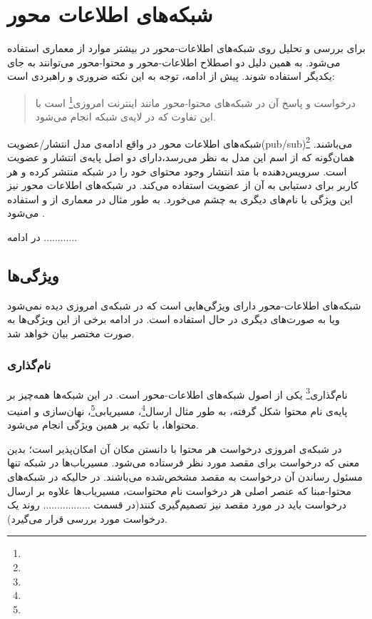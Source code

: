 
\chapter{شبکه‌های اطلاعات محور}

برای بررسی و تحلیل روی شبکه‌های اطلاعات-محور در بیشتر موارد از معماری  استفاده می‌شود. به همین دلیل دو اصطلاح اطلاعات-محور و محتوا-محور می‌توانند به جای یکدیگر استفاده شوند. پیش از ادامه‌، توجه به این نکته ضروری و راهبردی است:
\begin{quote}
	درخواست و پاسخ آن در شبکه‌های محتوا-محور مانند اینترنت امروزی\footnote{} است با این تفاوت که در لایه‌ی شبکه انجام می‌شود.
\end{quote}

شبکه‌های اطلاعات محور در واقع ادامه‌ی مدل انتشار/عضویت(pub/sub)\footnote{} می‌باشند. همان‌گونه که از اسم این مدل به نظر می‌رسد،دارای دو اصل پایه‌ی انتشار و عضویت است. سرویس‌دهنده با متد انتشار وجود محتوای خود را در شبکه منتشر کرده و هر کاربر برای دستیابی به آن از عضویت استفاده می‌کند. در شبکه‌های اطلاعات محور نیز این ویژگی با نام‌های دیگری به چشم می‌خورد. به طور مثال در معماری  از  و  استفاده می‌شود \cite{ndn}.

در ادامه ............


\section{ویژگی‌ها}
شبکه‌های اطلاعات-محور دارای ویژگی‌هایی است که در شبکه‌ی امروزی دیده نمی‌شود ویا به صورت‌های دیگری در حال استفاده است. در ادامه برخی از این ویژگی‌ها به صورت مختصر بیان خواهد شد.

\subsection{نام‌گذاری}
نام‌گذاری\footnote{} یکی از اصول شبکه‌های اطلاعات-محور است. در این شبکه‌ها همه‌چیز بر پایه‌ی نام محتوا شکل گرفته، به طور مثال ارسال\footnote{}، مسیریابی\footnote{}، نهان‌سازی و امنیت محتواها، با تکیه بر همین ویژگی انجام می‌شود. 

در شبکه‌ی امروزی درخواست هر محتوا با دانستن مکان آن امکان‌پذیر است؛ بدین معنی که درخواست برای مقصد مورد نظر فرستاده می‌شود. مسیریاب‌ها در شبکه تنها مسئول رساندن آن درخواست به مقصد مشخص‌شده می‌باشند. در حالیکه در شبکه‌های محتوا-مبنا که عنصر اصلی هر درخواست نام محتواست، مسیریاب‌ها علاوه بر ارسال درخواست باید در مورد مقصد نیز تصمیم‌گیری کنند(در قسمت ................. روند یک درخواست مورد بررسی قرار می‌گیرد).

